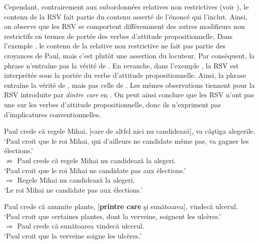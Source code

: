 Cependant, contrairement aux subordonnées relatives non restrictives (voir \citealt{Arnold2004,Arnold2007,ArnoldEtAl2008}), le contenu de la RSV fait partie du contenu asserté de l’énoncé qui l’inclut. Ainsi, on observe que les RSV se comportent différemment des autres modifieurs non restrictifs en termes de portée des verbes d’attitude propositionnelle. Dans l’exemple , le contenu de la relative non restrictive ne fait pas partie des croyances de Paul, mais c’est plutôt une assertion du locuteur. Par conséquent, la phrase  n’entraîne pas la vérité de . En revanche, dans l’exemple , la RSV est interprétée sous la portée du verbe d’attitude propositionnelle. Ainsi, la phrase  entraîne la vérité de , mais pas celle de . Les mêmes observations tiennent pour la RSV introduite par \textit{dintre care} en . On peut ainsi conclure que les RSV n’ont pas une  sur les verbes d’attitude propositionnelle, donc ils n’expriment pas d’implicatures conventionnelles.

\ea \label{ch3:ex51}
\ea
Paul crede că regele Mihai, [care de altfel nici nu candidează], va câştiga alegerile. \label{ch3:ex51a}\\
\glt ‘Paul croit que le roi Mihai, qui d’ailleurs ne candidate même pas, va gagner les élections.’ \\

\ex 
${\nRightarrow}$ Paul crede că regele Mihai nu candidează la alegeri. \label{ch3:ex51b}\\
\glt ‘Paul croit que le roi Mihai ne candidate pas aux élections.’\\

\ex
${\Rightarrow}$ Regele Mihai nu candidează la alegeri. \label{ch3:ex51c}\\
\glt ‘Le roi Mihai ne candidate pas aux élections.’
\z 
\z 


\ea \label{ch3:ex52}
\ea
Paul crede că anumite plante, [\textbf{printre care} şi sunătoarea], vindecă ulcerul. \label{ch3:ex52a}\\
\glt ‘Paul croit que certaines plantes, dont la verveine, soignent les ulcères.’ \\

\ex 
${\Rightarrow}$ Paul crede că sunătoarea vindecă ulcerul. \label{ch3:ex52b}\\
\glt ‘Paul croit que la verveine soigne les ulcères.’\\

